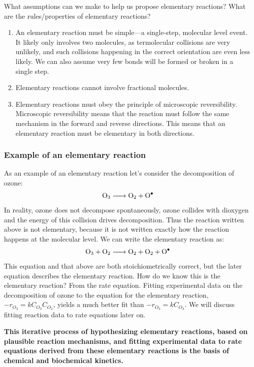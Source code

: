 \documentclass[
]{article}
\begin{document}
What assumptions can we make to help us propose elementary reactions? What are the rules/properties of elementary reactions?

\begin{enumerate}
\def\labelenumi{\arabic{enumi}.}
\item
  An elementary reaction must be simple---a single-step, molecular level event. It likely only involves two molecules, as termolecular collisions are very unlikely, and such collisions happening in the correct orientation are even less likely. We can also assume very few bonds will be formed or broken in a single step.
\item
  Elementary reactions cannot involve fractional molecules.
\item
  Elementary reactions must obey the principle of microscopic reversibility. Microscopic reversibility means that the reaction must follow the same mechanism in the forward and reverse directions. This means that an elementary reaction must be elementary in both directions.
\end{enumerate}

\hypertarget{example-of-an-elementary-reaction}{%
\subsubsection{Example of an elementary reaction}\label{example-of-an-elementary-reaction}}

As an example of an elementary reaction let's consider the decomposition of ozone:
\[ \ce{O3 -> O2 + O^.} \]
In reality, ozone does not decompose spontaneously, ozone collides with dioxygen and the energy of this collision drives decomposition. Thus the reaction written above is not elementary, because it is not written exactly how the reaction happens at the molecular level. We can write the elementary reaction as:
\[ \ce{O3 + O2 -> O2 + O2 + O^.} \]
This equation and that above are both stoichiometrically correct, but the later equation describes the elementary reaction. How do we know this is the elementary reaction? From the rate equation. Fitting experimental data on the decomposition of ozone to the equation for the elementary reaction, \(-r_{O_3} = kC_{O_3}C_{O_2}\), yields a much better fit than \(-r_{O_3} = kC_{O_3}\). We will discuss fitting reaction data to rate equations later on.

\textbf{This iterative process of hypothesizing elementary reactions, based on plausible reaction mechanisms, and fitting experimental data to rate equations derived from these elementary reactions is the basis of chemical and biochemical kinetics.}
\end{document}
